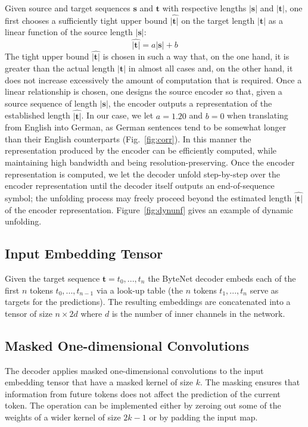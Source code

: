 \documentclass{article}
\newcommand{\figref}[1]{Fig.~\ref{#1}}
\renewcommand{\vec}{\mathbf}
\begin{document}
Given source and target sequences $\vec{s}$ and $\vec{t}$ with respective lengths $|\vec{s}|$ and $|\vec{t}|$, one first chooses a sufficiently tight upper bound $\hat{|\vec{t}|}$ on the target length $|\vec{t}|$ as a linear function of the source length $|\vec{s}|$:
\begin{equation}
\label{eq:unfold}
\hat{|\vec{t}|} = a |\vec{s}| + b
\end{equation}
The tight upper bound $\hat{|\vec{t}|}$ is chosen in such a way that, on the one hand, it is greater than the actual length $|\vec{t}|$ in almost all cases and, on the other hand, it does not increase excessively the  amount of computation that is required. Once a linear relationship is chosen, one designs the source encoder so that, given a source sequence of length $|\vec{s}|$, the encoder outputs a representation of the established length $\hat{|\vec{t}|}$. In our case, we let $a=1.20$ and $b=0$ when translating from English into German, as German sentences tend to be somewhat longer than their English counterparts (\figref{fig:corr}). In this manner the representation produced by the encoder can be efficiently computed, while maintaining high bandwidth and being resolution-preserving. Once the encoder representation is computed, we let the decoder unfold step-by-step over the encoder representation until the decoder itself outputs an end-of-sequence symbol; the unfolding process may freely proceed beyond the estimated length $\hat{|\vec{t}|}$ of the encoder representation. Figure~\ref{fig:dynunf} gives an example of dynamic unfolding. 


\subsection{Input Embedding Tensor}
Given the target sequence $\vec{t} = t_0,...,t_{n}$ the ByteNet decoder embeds each of the first $n$ tokens $t_0,...,t_{n-1}$ via a look-up table (the $n$ tokens $t_1,...,t_{n}$ serve as targets for the predictions). The resulting embeddings are concatenated into a tensor of size $n \times 2d$ where $d$ is the number of inner channels in the network.


\subsection{Masked One-dimensional Convolutions}
\label{masked}
The decoder applies masked one-dimensional convolutions \citep{van2016pixel} to the input embedding tensor that have a masked kernel of size $k$. The masking ensures that information from future tokens does not affect the prediction of the current token.  The operation can be implemented either by zeroing out some of the weights of a wider kernel of size $2k-1$ or by padding the input map. 
\end{document}
